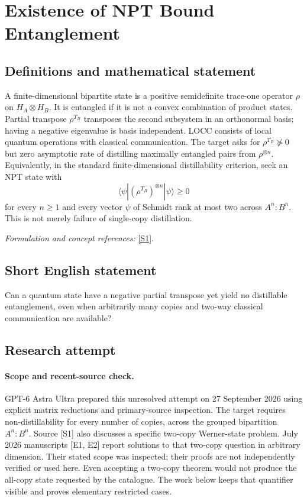 \documentclass[11pt]{article}
\begin{document}
\section*{\texorpdfstring{Existence of NPT Bound Entanglement}{Existence of NPT Bound Entanglement}}\label{276}
\subsection{Definitions and mathematical statement}
A finite-dimensional bipartite state is a positive semidefinite trace-one operator $\rho$ on $H_A\otimes H_B$. It is entangled if it is not a convex combination of product states. Partial transpose $\rho^{T_B}$ transposes the second subsystem in an orthonormal basis; having a negative eigenvalue is basis independent. LOCC consists of local quantum operations with classical communication. The target asks for $\rho^{T_B}\not\succeq0$ but zero asymptotic rate of distilling maximally entangled pairs from $\rho^{\otimes n}$. Equivalently, in the standard finite-dimensional distillability criterion, seek an NPT state with
\[
 \langle\psi|(\rho^{T_B})^{\otimes n}|\psi\rangle\ge0
\]
for every $n\ge1$ and every vector $\psi$ of Schmidt rank at most two across $A^n:B^n$. This is not merely failure of single-copy distillation.
\par\smallskip\textit{Formulation and concept references:} \href{https://arxiv.org/pdf/2002.03233}{[S1]}.

\subsection{Short English statement}
Can a quantum state have a negative partial transpose yet yield no distillable entanglement, even when arbitrarily many copies and two-way classical communication are available?
\subsection{Research attempt}
\paragraph{Scope and recent-source check.}
GPT-6 Astra Ultra prepared this unresolved attempt on 27 September 2026
using explicit matrix reductions and primary-source inspection. The
target requires non-distillability for every number of copies, across
the grouped bipartition $A^n:B^n$. Source [S1] also discusses a
specific two-copy Werner-state problem. July 2026 manuscripts [E1, E2]
report solutions to that two-copy question in arbitrary dimension.
Their stated scope was inspected; their proofs are not independently
verified or used here. Even accepting a two-copy theorem would not
produce the all-copy state requested by the catalogue. The work below
keeps that quantifier visible and proves elementary restricted cases.
\end{document}
